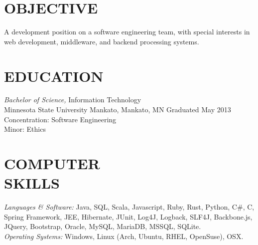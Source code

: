 \documentclass[line,margin]{res}
\begin{document}
\address{1430 Taylor Ave W, St. Paul, MN 55104}
\address{
    \Mobilefone \hspace{1 pt} (651)-285-4565 | 
    \Letter \hspace{1 pt} \href{mailto:drew@sothr.com?subject=Concerning Your Resume}{drew@sothr.com} | 
    \Mundus \hspace{1 pt} \url{https://www.sothr.com}
}

\begin{resume}

\section{OBJECTIVE} A development position on a software engineering team, with special 
                interests in web development, middleware, and backend processing systems. 

\section{EDUCATION} {\sl Bachelor of Science,} Information Technology \\
                Minnesota State University Mankato, Mankato, MN 
                Graduated May 2013 \\
                Concentration: Software Engineering \\
                Minor: Ethics 

\section{COMPUTER \\ SKILLS} {\sl Languages \& Software:} Java, SQL, Scala, Javascript, 
         Ruby, Rust, Python, C\#, C, Spring Framework, JEE, 
                Hibernate, JUnit, Log4J, Logback, SLF4J, 
                Backbone.js, JQuery, Bootstrap, 
                Oracle, MySQL, MariaDB, MSSQL, SQLite. \\
                {\sl Operating Systems:} Windows, Linux (Arch, Ubuntu, RHEL, OpenSuse), OSX.


\end{resume}
\end{document}

